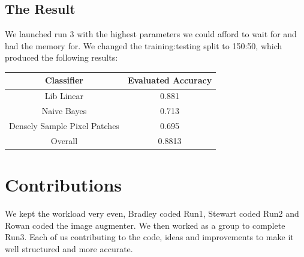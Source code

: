\documentclass{article}
\begin{document}
	\subsection{The Result}
	We launched run 3 with the highest parameters we could afford to wait for and had the memory for. We changed the training:testing split to 150:50, which produced the following results:\\
	\centering
	\begin{tabular}{|c|c|}
		\hline
		\textbf{Classifier} & \textbf{Evaluated Accuracy}\\ \hline
		Lib Linear & 0.881\\
		Naive Bayes & 0.713\\
		Densely Sample Pixel Patches & 0.695\\ \hline \hline
		Overall & 0.8813\\ \hline
	\end{tabular}
	\flushleft
	\section{Contributions}
	We kept the workload very even, Bradley coded Run1, Stewart coded Run2 and Rowan coded the image augmenter. We then worked as a group to complete Run3. Each of us contributing to the code, ideas and improvements to make it well structured and more accurate.
	
	
\end{document}
